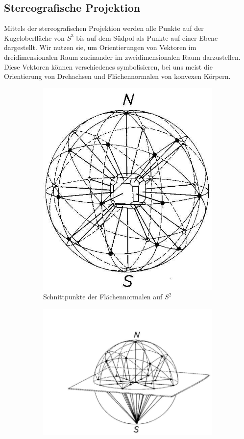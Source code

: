 \subsection{Stereografische Projektion}
Mittels der stereografischen Projektion werden alle Punkte auf der Kugeloberfläche von $S^3$ bis auf dem Südpol als Punkte auf einer Ebene dargestellt. Wir nutzen sie, um Orientierungen von Vektoren im dreidimensionalen Raum zueinander im zweidimensionalen Raum darzustellen. Diese Vektoren können verschiedenes symbolisieren, bei uns meist die Orientierung von Drehachsen und Flächennormalen von konvexen Körpern.
\begin{figure}%
\centering
\begin{subfigure}{0.4\textwidth}
	\centering
	\includegraphics[width=0.8\linewidth]{./pictures/stpr1.jpg}
	\caption{Schnittpunkte der Flächennormalen auf $S^2$}
\end{subfigure}%
\begin{subfigure}{0.4\textwidth}
	\centering
	\includegraphics[width=1.2\linewidth]{./pictures/stpr2.jpg}

\end{subfigure}
\end{figure}
